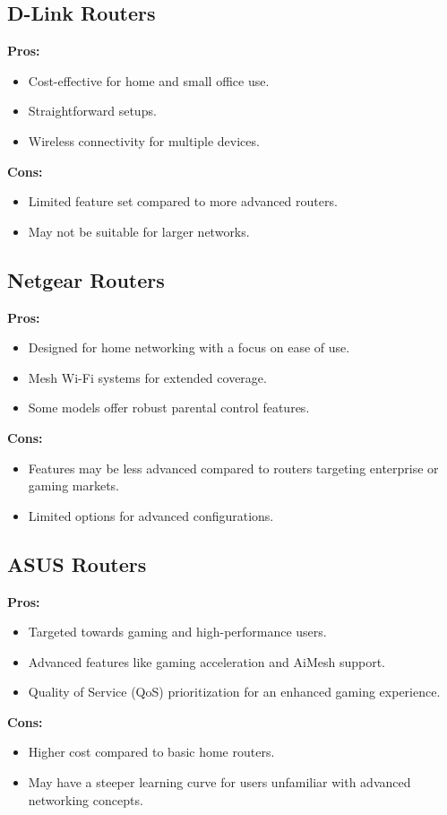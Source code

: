 \documentclass[11pt]{article}
\begin{document}
\subsection{D-Link Routers}
\textbf{Pros:}
\begin{itemize}
  \item Cost-effective for home and small office use.
  \item Straightforward setups.
  \item Wireless connectivity for multiple devices.
\end{itemize}
\textbf{Cons:}
\begin{itemize}
  \item Limited feature set compared to more advanced routers.
  \item May not be suitable for larger networks.
\end{itemize}

\subsection{Netgear Routers}
\textbf{Pros:}
\begin{itemize}
  \item Designed for home networking with a focus on ease of use.
  \item Mesh Wi-Fi systems for extended coverage.
  \item Some models offer robust parental control features.
\end{itemize}
\textbf{Cons:}
\begin{itemize}
  \item Features may be less advanced compared to routers targeting enterprise or
        gaming markets.
  \item Limited options for advanced configurations.
\end{itemize}

\subsection{ASUS Routers}
\textbf{Pros:}
\begin{itemize}
  \item Targeted towards gaming and high-performance users.
  \item Advanced features like gaming acceleration and AiMesh support.
  \item Quality of Service (QoS) prioritization for an enhanced gaming experience.
\end{itemize}
\textbf{Cons:}
\begin{itemize}
  \item Higher cost compared to basic home routers.
  \item May have a steeper learning curve for users unfamiliar with advanced networking
        concepts.
\end{itemize}
\end{document}
